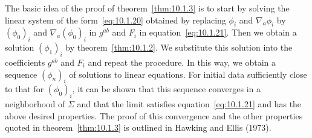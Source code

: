 The basic idea of the proof of theorem~\ref{thm:10.1.3} is to start by solving the
linear system of the form~\eqref{eq:10.1.20} obtained by replacing \(\phi_i\) and
\(\nabla_a\phi_i\) by \((\phi_0)_i\) and \(\nabla_a(\phi_0)_i\) in \(g^{ab}\) and
\(F_i\) in equation~\eqref{eq:10.1.21}. Then we obtain a solution \((\phi_1)_i\) by
theorem~\ref{thm:10.1.2}. We substitute this solution into the coefficients \(g^{ab}\)
and \(F_i\) and repeat the procedure. In this way, we obtain a sequence \((\phi_n)_i\)
of solutions to linear equations. For initial data sufficiently close to that for
\((\phi_0)_i\), it can be shown that this sequence converges in a neighborhood of
\(\Sigma\) and that the limit satisfies equation~\eqref{eq:10.1.21} and has the above
desired properties. The proof of this convergence and the other properties quoted in
theorem~\ref{thm:10.1.3} is outlined in Hawking and Ellis (1973).
